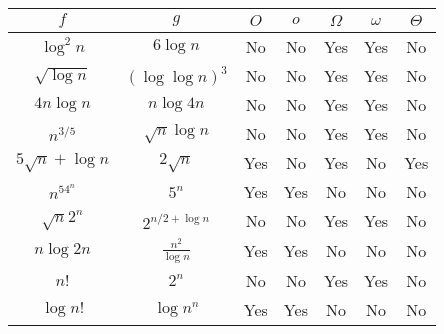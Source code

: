 \documentclass{article}
\begin{document}
\begin{table}[!hbp]
\begin{tabular}{*{7}{|c}|}
\hline $\mathit{f}$&$\mathit{g}$&$\mathit{O}$&$\mathit{o}$&$\Omega$&$\omega$&$\Theta$\\
\hline $\log^2n$&$6\log n$&No&No&Yes&Yes&No\\
\hline $\sqrt{\log n}$&$(\log \log n )^3$&No&No&Yes&Yes&No\\
\hline $4n\log n$&$n\log 4n$&No&No&Yes&Yes&No\\
\hline $n^{3/5}$&$\sqrt{n}\log n$&No&No&Yes&Yes&No\\
\hline $5\sqrt{n}+\log n$&$2\sqrt{n}$&Yes&No&Yes&No&Yes \\
\hline $n^54^n$&$5^n$&Yes&Yes&No&No&No\\
\hline $\sqrt{n}2^n$&$2^{n/2+\log n}$&No&No&Yes&Yes&No\\
\hline $n\log 2n$&$\frac{n^2}{\log n}$&Yes&Yes&No&No&No\\
\hline $n!$&$2^n$&No&No&Yes&Yes&No\\
\hline $\log n!$&$\log n^n$&Yes&Yes&No&No&No\\
\hline
\end{tabular}
\end{table}
\end{document}

